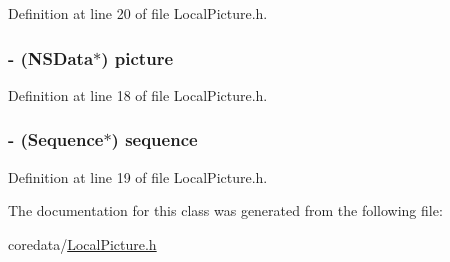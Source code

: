 Definition at line 20 of file LocalPicture.h.

\hypertarget{interface_local_picture_a757efbf7fad3c9e42f975cbaa4d8a7a5}{
\subsubsection[{picture}]{\setlength{\rightskip}{0pt plus 5cm}-\/ (NSData$\ast$) picture}}
\label{interface_local_picture_a757efbf7fad3c9e42f975cbaa4d8a7a5}


Definition at line 18 of file LocalPicture.h.

\hypertarget{interface_local_picture_a17f2837cead21bb5f65fb4cda2845b21}{
\subsubsection[{sequence}]{\setlength{\rightskip}{0pt plus 5cm}-\/ ({\bf Sequence}$\ast$) sequence}}
\label{interface_local_picture_a17f2837cead21bb5f65fb4cda2845b21}


Definition at line 19 of file LocalPicture.h.



The documentation for this class was generated from the following file:\begin{DoxyCompactItemize}
\item 
coredata/\hyperlink{_local_picture_8h}{LocalPicture.h}\end{DoxyCompactItemize}
